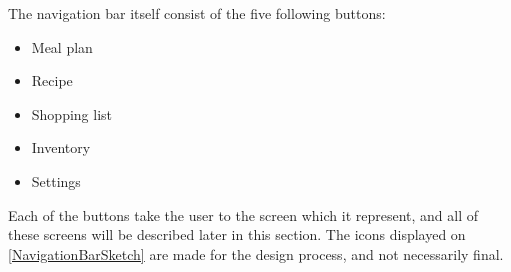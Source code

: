 The navigation bar itself consist of the five following buttons:

\begin{itemize}
    \item Meal plan
    \item Recipe
    \item Shopping list
    \item Inventory
    \item Settings
\end{itemize}

Each of the buttons take the user to the screen which it represent, and all of these screens will be described later in this section. The icons displayed on \cref{NavigationBarSketch} are made for the design process, and not necessarily final.






